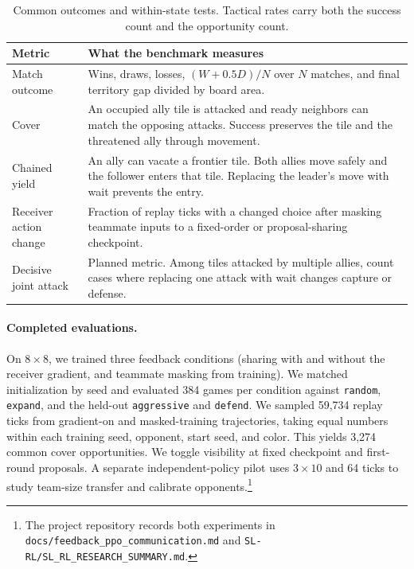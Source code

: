 \documentclass{article}
\begin{document}
\begin{table}[H]
  \centering
  \caption{Common outcomes and within-state tests. Tactical rates carry both the success count and the opportunity count.}
  \label{tab:metrics}
  \begin{tabularx}{\linewidth}{@{}>{\raggedright\arraybackslash}p{.25\linewidth}>{\raggedright\arraybackslash}X@{}}
    \toprule
    Metric & What the benchmark measures \\
    \midrule
    Match outcome & Wins, draws, losses, \((W+0.5D)/N\) over \(N\) matches, and final territory gap divided by board area. \\
    Cover & An occupied ally tile is attacked and ready neighbors can match the opposing attacks. Success preserves the tile and the threatened ally through movement. \\
    Chained yield & An ally can vacate a frontier tile. Both allies move safely and the follower enters that tile. Replacing the leader's move with wait prevents the entry. \\
    Receiver action change & Fraction of replay ticks with a changed choice after masking teammate inputs to a fixed-order or proposal-sharing checkpoint. \\
    Decisive joint attack & Planned metric. Among tiles attacked by multiple allies, count cases where replacing one attack with wait changes capture or defense. \\
    \bottomrule
  \end{tabularx}
\end{table}

\paragraph{Completed evaluations.}
On \(8\times8\), we trained three feedback conditions (sharing with and without the receiver gradient, and teammate masking from training). We matched initialization by seed and evaluated 384 games per condition against \texttt{random}, \texttt{expand}, and the held-out \texttt{aggressive} and \texttt{defend}. We sampled 59,734 replay ticks from gradient-on and masked-training trajectories, taking equal numbers within each training seed, opponent, start seed, and color. This yields 3,274 common cover opportunities. We toggle visibility at fixed checkpoint and first-round proposals. A separate independent-policy pilot uses \(3\times10\) and 64 ticks to study team-size transfer and calibrate opponents.\footnote{The project repository records both experiments in \texttt{docs/feedback\_ppo\_communication.md} and \texttt{SL-RL/SL\_RL\_RESEARCH\_SUMMARY.md}.}
\end{document}
